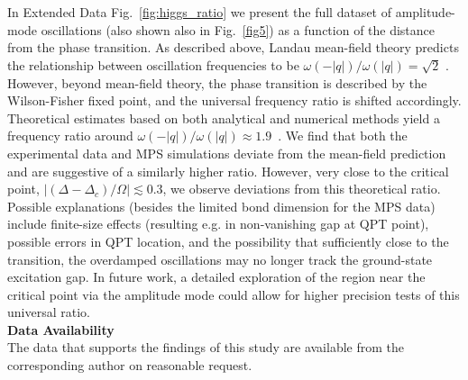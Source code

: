 \documentclass[reprint,twocolumn,secnumarabic,amssymb, aps, prx]{revtex4-2}
\begin{document}
\\
\\
In Extended Data Fig.~\ref{fig:higgs_ratio} we present the full dataset of amplitude-mode oscillations (also shown also in Fig.~\ref{fig5}) as a function of the distance from the phase transition.
As described above, Landau mean-field theory  predicts the relationship between oscillation frequencies to be $\omega(-|q|)/\omega(|q|) = \sqrt{2}$ \cite{ruegg2008quantum, sachdev2009exotic}. 
However, beyond mean-field theory, the phase transition is described by the Wilson-Fisher fixed point,
and the universal frequency ratio is shifted accordingly.
Theoretical estimates based on both analytical and numerical methods yield a frequency ratio around $\omega(-|q|)/\omega(|q|) \approx 1.9$~\cite{sachdev1997theory, brezin1974,caselle1997,campostrini2002}.
We find that both the experimental data and MPS simulations deviate from the mean-field prediction and are suggestive of a similarly higher ratio. However, very close to the critical point, $|(\Delta-\Delta_c)/\Omega|\lesssim 0.3$, we observe deviations from this theoretical ratio.
Possible explanations (besides the limited bond dimension for the MPS data) include finite-size effects (resulting e.g.  in non-vanishing gap at QPT point), possible errors in QPT location, and the possibility that  sufficiently close to the transition, the overdamped oscillations may no longer track the ground-state excitation gap.
In future work, a detailed exploration of the region near the critical point via the amplitude mode could allow for higher precision tests of this universal ratio. \\


\noindent\textbf{Data Availability}\\
The data that supports the findings of this study are available from the corresponding author on reasonable request.\\
\end{document}
